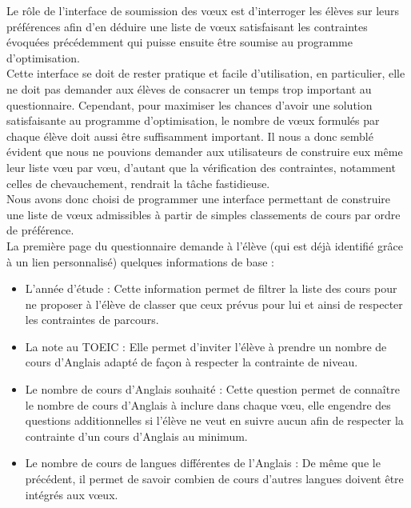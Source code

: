 \documentclass[12pt]{article}
\begin{document}
    Le rôle de l’interface de soumission des vœux est d’interroger les élèves sur leurs préférences afin d’en déduire une liste de vœux satisfaisant les contraintes évoquées précédemment qui puisse ensuite être soumise au programme d’optimisation. \\

Cette interface se doit de rester pratique et facile d’utilisation, en particulier, elle ne doit pas demander aux élèves de consacrer un temps trop important au questionnaire. Cependant, pour maximiser les chances d’avoir une solution satisfaisante au programme d’optimisation, le nombre de vœux formulés par chaque élève doit aussi être suffisamment important. Il nous a donc semblé évident que nous ne pouvions demander aux utilisateurs de construire eux même leur liste vœu par vœu, d’autant que la vérification des contraintes, notamment celles de chevauchement, rendrait la tâche fastidieuse. \\

Nous avons donc choisi de programmer une interface permettant de construire une liste de vœux admissibles à partir de simples classements de cours par ordre de préférence. \\
    
La première page du questionnaire demande à l’élève (qui est déjà identifié grâce à un lien personnalisé) quelques informations de base :  \\

\begin{itemize}
  \item L’année d’étude : Cette information permet de filtrer la liste des cours pour ne proposer à l’élève de classer que ceux prévus pour lui et ainsi de respecter les contraintes de parcours. 
  \item La note au TOEIC : Elle permet d’inviter l’élève à prendre un nombre de cours d’Anglais adapté de façon à respecter la contrainte de niveau. 
  \item Le nombre de cours d’Anglais souhaité : Cette question permet de connaître le nombre de cours d’Anglais à inclure dans chaque vœu, elle engendre des questions additionnelles si l’élève ne veut en suivre aucun afin de respecter la contrainte d’un cours d’Anglais au minimum. 
  \item Le nombre de cours de langues différentes de l’Anglais : De même que le précédent, il permet de savoir combien de cours d’autres langues doivent être intégrés aux vœux.
\end{itemize}
\end{document}
